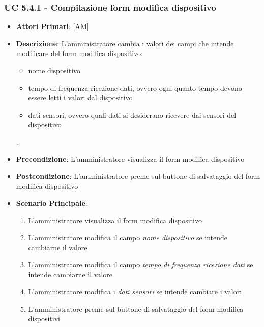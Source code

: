 			\subsubsection{UC 5.4.1 - Compilazione form modifica dispositivo}
			\begin{itemize}
				\item \textbf{Attori Primari}: [AM]
				\item \textbf{Descrizione}: L'amministratore cambia i valori dei campi che intende modificare del form modifica dispositivo:
				\begin{itemize}
					\item nome dispositivo
					\item tempo di frequenza ricezione dati, ovvero ogni quanto tempo devono essere letti i valori dal dispositivo
					\item dati sensori, ovvero quali dati si desiderano ricevere dai sensori del dispositivo
				\end{itemize}.
				\item \textbf{Precondizione}: L'amministratore visualizza il form modifica dispositivo
				\item \textbf{Postcondizione}: L'amministratore preme sul buttone di salvataggio del form modifica dispositivo
				\item \textbf{Scenario Principale}:
				\begin{enumerate}
					\item{L'amministratore visualizza il form modifica dispositivo}
					\item{L'amministratore modifica il campo \textit{nome dispositivo} se intende cambiarne il valore}
					\item{L'amministratore modifica il campo \textit{tempo di frequenza ricezione dati} se intende cambiarne il valore}
					\item{L'amministratore modifica i \textit{dati sensori} se intende cambiare i valori}
					\item{L'amministratore preme sul buttone di salvataggio del form modifica dispositivi}
				\end{enumerate}
			\end{itemize}
			
